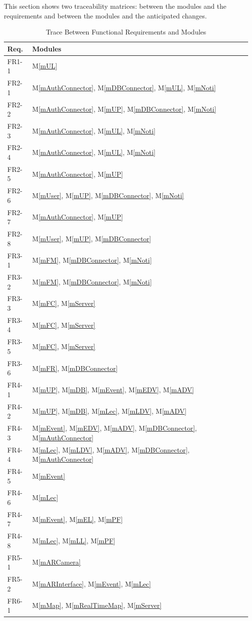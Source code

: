 \documentclass[12pt, titlepage]{article}
\newcommand{\mref}[1]{M\ref{#1}}
\begin{document}
This section shows two traceability matrices: between the modules and the
requirements and between the modules and the anticipated changes.

\begin{table}[H]
\centering
\begin{tabular}{p{} p{}}
\toprule
\textbf{Req.} & \textbf{Modules}\\
\midrule
FR1-1 & \mref{mUL}\\
FR2-1 & \mref{mAuthConnector}, \mref{mDBConnector}, \mref{mUL}, \mref{mNoti}\\
FR2-2 & \mref{mAuthConnector}, \mref{mUP}, \mref{mDBConnector}, \mref{mNoti}\\
FR2-3 & \mref{mAuthConnector}, \mref{mUL}, \mref{mNoti}\\
FR2-4 & \mref{mAuthConnector}, \mref{mUL}, \mref{mNoti}\\
FR2-5 & \mref{mAuthConnector}, \mref{mUP}\\
FR2-6 & \mref{mUser}, \mref{mUP}, \mref{mDBConnector}, \mref{mNoti}\\
FR2-7 & \mref{mAuthConnector}, \mref{mUP}\\
FR2-8 & \mref{mUser}, \mref{mUP}, \mref{mDBConnector}\\
FR3-1 & \mref{mFM}, \mref{mDBConnector}, \mref{mNoti}\\
FR3-2 & \mref{mFM}, \mref{mDBConnector}, \mref{mNoti}\\
FR3-3 & \mref{mFC}, \mref{mServer}\\
FR3-4 & \mref{mFC}, \mref{mServer}\\
FR3-5 & \mref{mFC}, \mref{mServer}\\
FR3-6 & \mref{mFR}, \mref{mDBConnector}\\
FR4-1 & \mref{mUP}, \mref{mDB}, \mref{mEvent}, \mref{mEDV}, \mref{mADV}\\
FR4-2 & \mref{mUP}, \mref{mDB}, \mref{mLec}, \mref{mLDV}, \mref{mADV}\\
FR4-3 & \mref{mEvent}, \mref{mEDV}, \mref{mADV}, \mref{mDBConnector}, \mref{mAuthConnector}\\
FR4-4 & \mref{mLec}, \mref{mLDV}, \mref{mADV}, \mref{mDBConnector}, \mref{mAuthConnector}\\
FR4-5 & \mref{mEvent}\\
FR4-6 & \mref{mLec}\\
FR4-7 & \mref{mEvent}, \mref{mEL}, \mref{mPF}\\
FR4-8 & \mref{mLec}, \mref{mLL}, \mref{mPF}\\
FR5-1 & \mref{mARCamera}\\
FR5-2 & \mref{mARInterface}, \mref{mEvent}, \mref{mLec}\\
FR6-1 & \mref{mMap}, \mref{mRealTimeMap}, \mref{mServer}\\
\bottomrule
\end{tabular}
\caption{Trace Between Functional Requirements and Modules}
\label{TblFRT}
\end{table}
\end{document}
